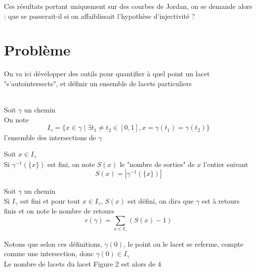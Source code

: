 \documentclass{article}
\begin{document}
\begin{flushleft}
\begin{figure}[h]
\end{figure}

Ces résultats portant uniquement sur des courbes de Jordan, on se demande alors : que se passerait-il si on affaiblissait
l'hypothèse d'injectivité ? 

\section{Problème}

On va ici développer des outils pour quantifier à quel point un lacet "s'autointersecte", et définir un ensemble de lacets particuliers
\\~\\
\begin{tcolorbox}[colback = yellow!60!white, colframe = orange!90!white, title = Définition 1]
    Soit $\gamma$ un chemin\\
    On note
    \[I_{\gamma} = \{ x \in \gamma \mid \exists t_1 \neq t_2 \in [0, 1], x = \gamma(t_1) = \gamma(t_2) \}\]
    l'ensemble des intersections de $\gamma$
\end{tcolorbox}
\vspace{0.5cm}
\begin{tcolorbox}[colback = yellow!60!white, colframe = orange!90!white, title = Définition 2]
    Soit $x \in I_{\gamma}$\\
    Si $\gamma^{-1}(\{x\})$ est fini, on note $S(x)$ le "nombre de sorties" de $x$ l'entier suivant
    \[S(x) = |\gamma^{-1}(\{x\})|\]
\end{tcolorbox}
\vspace{0.5cm}
\begin{tcolorbox}[colback = yellow!60!white, colframe = orange!90!white, title = Définition 3]
    Soit $\gamma$ un chemin\\
    Si $I_{\gamma}$ est fini et pour tout $x \in I_{\gamma}$, $S(x)$ est défini, on dira que $\gamma$ est à retours finis
    et on note le nombre de retours
    \[r(\gamma) = \sum_{x \in I_{\gamma}} (S(x) - 1)\]
\end{tcolorbox}

Notons que selon ces définitions, $\gamma(0)$, le point ou le lacet se referme, compte comme une intersection, donc $\gamma(0) \in I_{\gamma}$\\
Le nombre de lacets du lacet Figure 2 est alors de 4\\


\end{flushleft}
\end{document}
